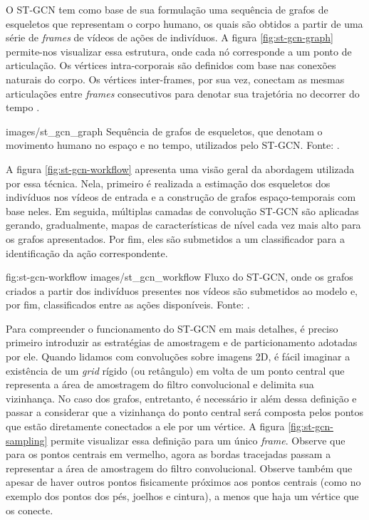 O ST-GCN tem como base de sua formulação uma sequência de grafos de esqueletos que representam o corpo humano, os quais são obtidos a partir de uma série de \textit{frames} de vídeos de ações de indivíduos. A figura \ref{fig:st-gcn-graph} permite-nos visualizar essa estrutura, onde cada nó corresponde a um ponto de articulação. Os vértices intra-corporais são definidos com base nas conexões naturais do corpo. Os vértices inter-frames, por sua vez, conectam as mesmas articulações entre \textit{frames} consecutivos para denotar sua trajetória no decorrer do tempo \cite{st-gcn-2018}.

    {images/st_gcn_graph}
    {Sequência de grafos de esqueletos, que denotam o movimento humano no espaço e no tempo, utilizados pelo ST-GCN. Fonte: \cite[p. 1]{st-gcn-2018}.}

A figura \ref{fig:st-gcn-workflow} apresenta uma visão geral da abordagem utilizada por essa técnica. Nela, primeiro é realizada a estimação dos esqueletos dos indivíduos nos vídeos de entrada e a construção de grafos espaço-temporais com base neles. Em seguida, múltiplas camadas de convolução ST-GCN são aplicadas gerando, gradualmente, mapas de características de nível cada vez mais alto para os grafos apresentados. Por fim, eles são submetidos a um classificador para a identificação da ação correspondente.

\image
    {fig:st-gcn-workflow}
    {images/st_gcn_workflow}
    {Fluxo do ST-GCN, onde os grafos criados a partir dos indivíduos presentes nos vídeos são submetidos ao modelo e, por fim, classificados entre as ações disponíveis. Fonte: \cite[p. 3]{st-gcn-2018}.}



Para compreender o funcionamento do ST-GCN em mais detalhes, é preciso primeiro introduzir as estratégias de amostragem e de particionamento adotadas por ele. Quando lidamos com convoluções sobre imagens 2D, é fácil imaginar a existência de um \textit{grid} rígido (ou retângulo) em volta de um ponto central que representa a área de amostragem do filtro convolucional e delimita sua vizinhança. No caso dos grafos, entretanto, é necessário ir além dessa definição e passar a considerar que a vizinhança do ponto central será composta pelos pontos que estão diretamente conectados a ele por um vértice. A figura \ref{fig:st-gcn-sampling} permite visualizar essa definição para um único \textit{frame}. Observe que para os pontos centrais em vermelho, agora as bordas tracejadas passam a representar a área de amostragem do filtro convolucional. Observe também que apesar de haver outros pontos fisicamente próximos aos pontos centrais (como no exemplo dos pontos dos pés, joelhos e cintura), a menos que haja um vértice que os conecte.

